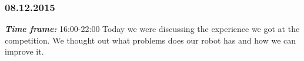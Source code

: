 \subsubsection{08.12.2015}
\textit{\textbf{Time frame:}} 16:00-22:00 \newline
Today we were discussing the experience we got at the competition.
We thought out what problems does our robot has and how we can improve it.

\begin{figure}[H]
	\begin{minipage}[h]{0.58\linewidth}

\end{minipage}
\end{figure}
